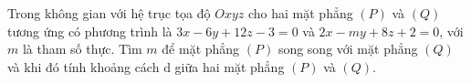 \begin{bt}%
	Trong không gian với hệ trục tọa độ $Oxyz$ cho hai mặt phẳng $(P)$ và $(Q)$ tương ứng có phương trình là $3x-6y+12z-3=0$ và $2x-my+8z+2=0$, với $m$ là tham số thực. Tìm $m$ để mặt phẳng $(P)$ song song với mặt phẳng $(Q)$ và khi đó tính khoảng cách $\mathrm{d}$ giữa hai mặt phẳng $(P)$ và $(Q)$. 
\end{bt}

